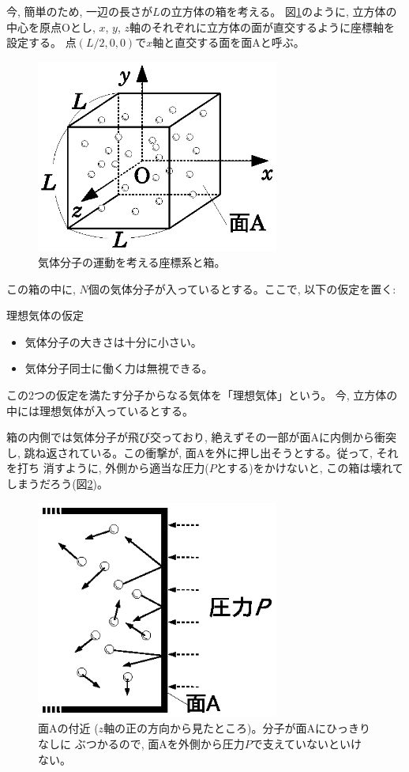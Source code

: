 今, 簡単のため, 一辺の長さが$L$の立方体の箱を考える。
図\ref{fig:gas_motion}のように, 立方体の中心を原点Oとし, 
$x$, $y$, $z$軸のそれぞれに立方体の面が直交するように座標軸を設定する。
点$(L/2, 0, 0)$で$x$軸と直交する面を面Aと呼ぶ。
\begin{figure}[h]
    \centering
    \includegraphics[width=8cm]{gas_motion.eps}
    \caption{気体分子の運動を考える座標系と箱。}\label{fig:gas_motion}
\end{figure}

この箱の中に, $N$個の気体分子が入っているとする。ここで, 以下の仮定を置く:
\begin{itembox}{理想気体の仮定}
\begin{itemize}
\item 気体分子の大きさは十分に小さい。
\item 気体分子同士に働く力は無視できる。
\end{itemize}
\end{itembox}
この2つの仮定を満たす分子からなる気体を「理想気体」という。
今, 立方体の中には理想気体が入っているとする。

箱の内側では気体分子が飛び交っており, 絶えずその一部が面Aに内側から衝突し, 
跳ね返されている。この衝撃が, 面Aを外に押し出そうとする。従って, それを打ち
消すように, 外側から適当な圧力($P$とする)をかけないと, この箱は壊れて
しまうだろう(図\ref{fig:gas_motionA})。

\begin{figure}[h]
    \centering
    \includegraphics[width=8cm]{gas_motionA.eps}
    \caption{面Aの付近 ($z$軸の正の方向から見たところ)。分子が面Aにひっきりなしに
ぶつかるので, 面Aを外側から圧力$P$で支えていないといけない。}\label{fig:gas_motionA}
\end{figure}

